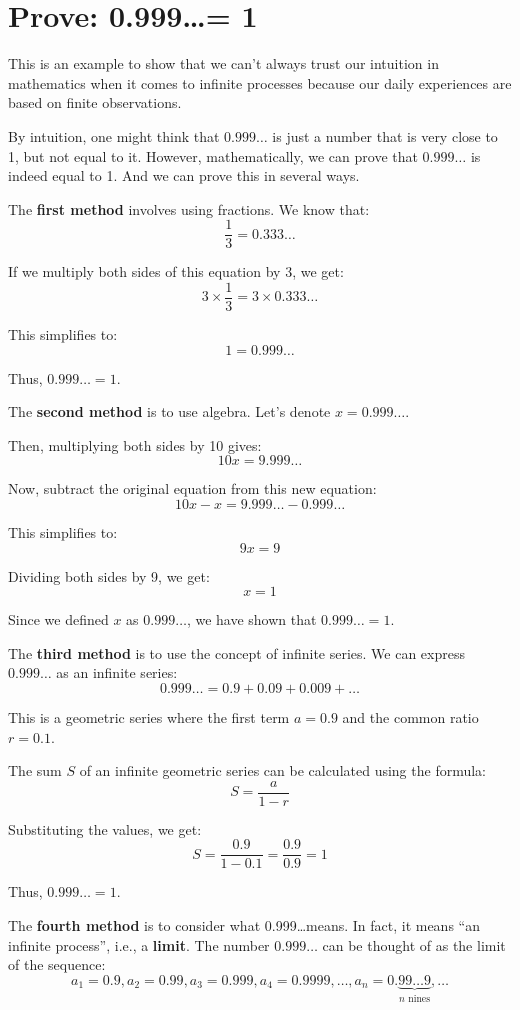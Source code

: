 \documentclass[12pt, letterpaper, oneside]{article}
\begin{document}
\section{Prove: 0.999\ldots = 1}

This is an example to show that we can't always trust our intuition in mathematics when it comes to infinite processes
because our daily experiences are based on finite observations.

By intuition, one might think that \(0.999\ldots\) is just a number that is very close to 1, but not equal to it.
However, mathematically, we can prove that \(0.999\ldots\) is indeed equal to 1. And we can prove this in several ways.

The \textbf{first method} involves using fractions. We know that:
\[\frac{1}{3} = 0.333\ldots\]

If we multiply both sides of this equation by 3, we get:
\[3 \times \frac{1}{3} = 3 \times 0.333\ldots\]

This simplifies to:
\[1 = 0.999\ldots\]

Thus, \(0.999\ldots = 1\).

The \textbf{second method} is to use algebra. Let's denote \(x = 0.999\ldots\).

Then, multiplying both sides by 10 gives:
\[10x = 9.999\ldots\]

Now, subtract the original equation from this new equation:
\[10x - x = 9.999\ldots - 0.999\ldots\]

This simplifies to:
\[9x = 9\]

Dividing both sides by 9, we get:
\[x = 1\]

Since we defined \(x\) as \(0.999\ldots\), we have shown that \(0.999\ldots = 1\).

The \textbf{third method} is to use the concept of infinite series. We can express \(0.999\ldots\) as an infinite series:
\[0.999\ldots = 0.9 + 0.09 + 0.009 + \ldots\]

This is a geometric series where the first term \(a = 0.9\) and the common ratio \(r = 0.1\).

The sum \(S\) of an infinite geometric series can be calculated using the formula:
\[S = \frac{a}{1 - r}\]

Substituting the values, we get:
\[S = \frac{0.9}{1 - 0.1} = \frac{0.9}{0.9} = 1\]

Thus, \(0.999\ldots = 1\).

The \textbf{fourth method} is to consider what 0.999\ldots means. In fact, it means ``an infinite process'', i.e., a
\textbf{limit}. The number \(0.999\ldots\) can be thought of as the limit of the sequence:
\[a_1 = 0.9, a_2 = 0.99, a_3 = 0.999, a_4 = 0.9999, \ldots, a_n = 0.\underbrace{99\ldots9}_{n \text{ nines}}, \ldots\]
\end{document}

